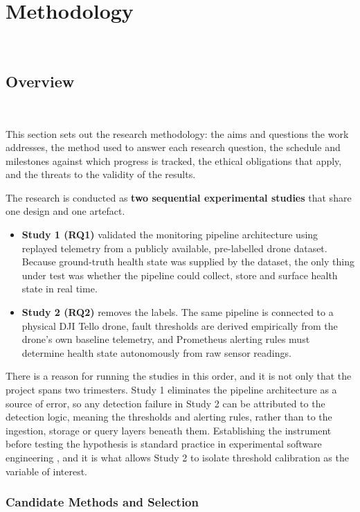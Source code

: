 \section{Methodology}~\label{sec:methodology}

\subsection{Overview}~\label{subsec:method-overview}

This section sets out the research methodology: the aims and questions the work
addresses, the method used to answer each research question, the schedule and
milestones against which progress is tracked, the ethical obligations that apply,
and the threats to the validity of the results.

The research is conducted as \textbf{two sequential experimental studies} that
share one design and one artefact.

\begin{itemize}
    \item \textbf{Study 1 (RQ1)} validated the monitoring pipeline architecture
    using replayed telemetry from a publicly available, pre-labelled drone
    dataset. Because ground-truth health state was supplied by the dataset, the
    only thing under test was whether the pipeline could collect, store and
    surface health state in real time.
    \item \textbf{Study 2 (RQ2)} removes the labels. The same pipeline is
    connected to a physical DJI Tello drone, fault thresholds are derived
    empirically from the drone's own baseline telemetry, and Prometheus alerting
    rules must determine health state autonomously from raw sensor readings.
\end{itemize}

There is a reason for running the studies in this order, and it is not only that
the project spans two trimesters. Study 1 eliminates the pipeline architecture as
a source of error, so any detection failure in Study 2 can be attributed to the
detection logic, meaning the thresholds and alerting rules, rather than to the
ingestion, storage or query layers beneath them. Establishing the instrument
before testing the hypothesis is standard practice in experimental software
engineering \citep{wohlin2012}, and it is what allows Study 2 to isolate
threshold calibration as the variable of interest.

\subsubsection{Candidate Methods and Selection}

